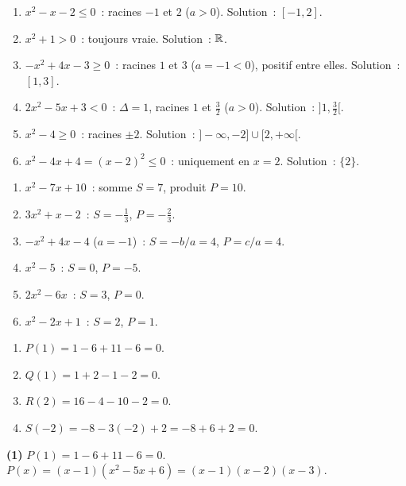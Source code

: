 \begin{enumerate}
  \item $x^2-x-2\leq0$~: racines $-1$ et $2$ ($a>0$). Solution~: $[-1,2]$.
  \item $x^2+1>0$~: toujours vraie. Solution~: $\mathbb{R}$.
  \item $-x^2+4x-3\geq0$~: racines $1$ et $3$ ($a=-1<0$), positif entre elles.
        Solution~: $[1,3]$.
  \item $2x^2-5x+3<0$~: $\Delta=1$, racines $1$ et $\frac{3}{2}$ ($a>0$).
        Solution~: $\bigl]1,\tfrac{3}{2}\bigr[$.
  \item $x^2-4\geq0$~: racines $\pm2$. Solution~: $]-\infty,-2]\cup[2,+\infty[$.
  \item $x^2-4x+4=(x-2)^2\leq0$~: uniquement en $x=2$. Solution~: $\{2\}$.
\end{enumerate}


\begin{enumerate}
  \item $x^2-7x+10$~: somme $S=7$, produit $P=10$.
  \item $3x^2+x-2$~: $S=-\tfrac{1}{3}$, $P=-\tfrac{2}{3}$.
  \item $-x^2+4x-4$ ($a=-1$)~: $S=-b/a=4$, $P=c/a=4$.
  \item $x^2-5$~: $S=0$, $P=-5$.
  \item $2x^2-6x$~: $S=3$, $P=0$.
  \item $x^2-2x+1$~: $S=2$, $P=1$.
\end{enumerate}


\begin{enumerate}
  \item $P(1)=1-6+11-6=0$.\checkmark
  \item $Q(1)=1+2-1-2=0$.\checkmark
  \item $R(2)=16-4-10-2=0$.\checkmark
  \item $S(-2)=-8-3(-2)+2=-8+6+2=0$.\checkmark
\end{enumerate}


\textbf{(1)} $P(1)=1-6+11-6=0$.\checkmark\quad
$P(x)=(x-1)(x^2-5x+6)=(x-1)(x-2)(x-3)$.

